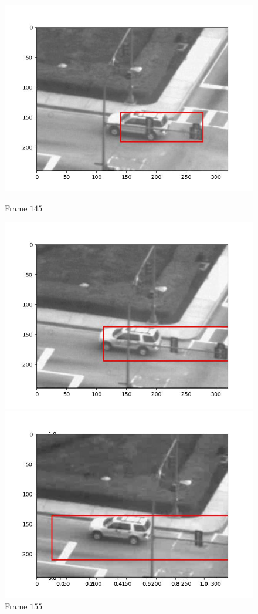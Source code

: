 \begin{figure}[H]
\begin{minipage}{.45\textwidth}
    \includegraphics[width=.8\textwidth]{./figures/lk_affine/car2/frame000145.jpg}
    \caption{Frame $145$}
  \end{minipage}
  \begin{minipage}{.45\textwidth}
    \centering
    \includegraphics[width=.8\textwidth]{./figures/lk_affine/car2/frame000155.jpg}
    \caption{Frame $155$}
  \end{minipage}
  \begin{minipage}{.45\textwidth}
    \centering
    \includegraphics[width=.8\textwidth]{./figures/lk_affine/car2/frame000165.jpg}

\end{minipage}
\end{figure}
